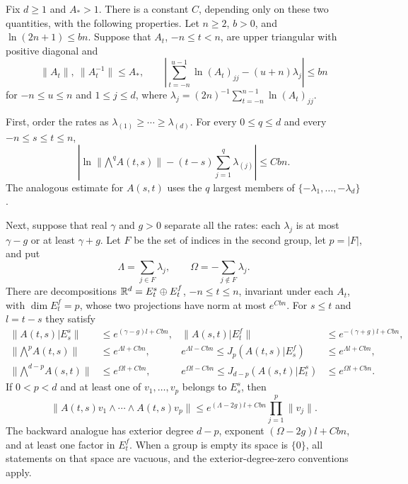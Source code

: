 \begin{proposition}\label{prop:finite-splitting}
Fix $d\geq1$ and $A_*>1$.  There is a constant $C$, depending only on
these two quantities, with the following properties.
Let $n\geq2$, $b>0$, and $\ln(2n+1)\leq bn$.
Suppose that $A_t$, $-n\leq t<n$, are upper triangular with positive
diagonal and
\[
 \|A_t\|,\ \|A_t^{-1}\|\leq A_*,
 \qquad
 \left|\sum_{t=-n}^{u-1}\ln(A_t)_{jj}
                  -(u+n)\lambda_j\right|\leq bn
\]
for $-n\leq u\leq n$ and $1\leq j\leq d$, where
$\lambda_j=(2n)^{-1}\sum_{t=-n}^{n-1}\ln(A_t)_{jj}$.

First, order the rates as
$\lambda_{(1)}\geq\cdots\geq\lambda_{(d)}$.
For every $0\leq q\leq d$ and every $-n\leq s\leq t\leq n$,
\begin{equation}\label{eq:exterior-rate-comparison}
 \left|\ln\|\mathord{\bigwedge}^q A(t,s)\|
       -(t-s)\sum_{j=1}^q\lambda_{(j)}\right|\leq Cbn.
\end{equation}
The analogous estimate for $A(s,t)$ uses the $q$ largest members of
$\{-\lambda_1,\ldots,-\lambda_d\}$.

Next, suppose that real $\gamma$ and $g>0$ separate all the rates:
each $\lambda_j$ is at most $\gamma-g$ or at least $\gamma+g$.
Let $F$ be the set of indices in the second group, let
$p=|F|$, and put
\[
 \Lambda=\sum_{j\in F}\lambda_j,\qquad
 \Omega=-\sum_{j\notin F}\lambda_j.
\]
There are decompositions
$\mathbb R^d=E_t^s\oplus E_t^f$, $-n\leq t\leq n$, invariant under each
$A_t$, with $\dim E_t^f=p$, whose two projections have norm at most
$e^{Cbn}$.  For $s\leq t$ and $l=t-s$ they satisfy
\begin{align}
 \|A(t,s)|E_s^s\|&\leq e^{(\gamma-g)l+Cbn},
 &
 \|A(s,t)|E_t^f\|&\leq e^{-(\gamma+g)l+Cbn},
 \label{eq:split-propagation}\\
 \|\mathord{\bigwedge}^p A(t,s)\|&\leq e^{\Lambda l+Cbn},
 &
 e^{\Lambda l-Cbn}\leq
 J_p(A(t,s)|E_s^f)&\leq e^{\Lambda l+Cbn},
 \label{eq:fast-volume}\\
 \|\mathord{\bigwedge}^{d-p} A(s,t)\|&\leq e^{\Omega l+Cbn},
 &
 e^{\Omega l-Cbn}\leq
 J_{d-p}(A(s,t)|E_t^s)&\leq e^{\Omega l+Cbn}.
 \label{eq:slow-backward-volume}
\end{align}
If $0<p<d$ and at least one of $v_1,\ldots,v_p$ belongs to $E_s^s$,
then
\begin{equation}\label{eq:mixed-exterior}
 \|A(t,s)v_1\wedge\cdots\wedge A(t,s)v_p\|
 \leq e^{(\Lambda-2g)l+Cbn}\prod_{j=1}^p\|v_j\|.
\end{equation}
The backward analogue has exterior degree $d-p$, exponent
$(\Omega-2g)l+Cbn$, and at least one factor in $E_t^f$.
When a group is empty its space is $\{0\}$, all statements on that
space are vacuous, and the exterior-degree-zero conventions apply.
\end{proposition}

